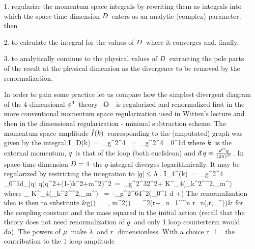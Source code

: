 1. regularize the momentum space integrals by
rewriting them as integrals into which the space-time
dimension \s$D\hspace{0.05cm}$ enters as an analytic (complex) parameter,
then
\vskip 0.2cm

2. to calculate the integral for the values of \s$D\hspace{0.05cm}$
where it converges and, finally,
\vskip 0.2cm

3. to analytically continue
to the physical values of \s$D\hspace{0.05cm}$ extracting the pole parts
of the result at the physical dimension as the divergence
to be removed by the renormalization.
\vskip 0.6cm


In order to gain some practice let us compare how the
simplest divergent diagram of the 4-dimensional \s$\phi^3\hspace{0.05cm}$
theory \s${\Large{-\hs{-0.1cm}{\rm O}\hs{-0.1cm}-}}\s$ is regularized
and renormalized first in the more conventional momentum
space regularization used in Witten's lecture and then
in the dimensional regularization - minimal subtraction scheme.
The momentum space amplitude \s$\hat I(k)\hspace{0.05cm}$
corresponding to the (amputated) graph
was given by the integral
\qq
\hat I_D(k)\ =\ {_{g^2}\over^4}
\ =\
{_{g^2}\over^4}
\int_0^1d\alpha{}
\label{ampel}
\qqq
where \s$k\hspace{0.05cm}$ is the external momentum, \s$q\hspace{0.05cm}$ is that
of the loop (both euclidean) and \s$\dd q \equiv{d^Dq\over{(2\pi)^D}}\s$.
In space-time dimension \s$D=4\hspace{0.05cm}$ the \s$q$-integral
diverges logarithmically. It may be regularized by restricting
the integration to \s$|q|\leq\Lambda\hspace{0.05cm}$.
\qq
\hat I_4^\La(k)\ =\ {_{g^2}\over^4}
\int_0^1d\alpha\int\limits_{|q|\leq\La}
{\dd q\over (q^2+\alpha(1-\alpha)k^2+m^2)^2}\ =\
{_{g^2}\over^{32\pi^2}}\s\m\ln{{_\La\over^\mu}}\s+\s
\hat K^\La_4({_{k^2}\over^{\mu^2}},{_m\over^\mu})
\non
\qqq
where
\qq
\lim\limits_{\La\to\infty}
\hat K^\La_4({_{k^2}\over^{\mu^2}},{_m\over^\mu})
\ =\ -{_{g^2}\over^{64\pi^2}}\left(\int_0^1 d\alpha
\s\s\ln{[\alpha(1-\alpha)\m{_{k^2}
\over^{\mu^2}}\m+\m{_{m^2}\over^{\mu^2}}]}
\s+\s1\right)
\label{finite}
\qqq
The renormalization idea is then to substitute
\qq
&g(\La)\ =\ \mu\la\s,\quad\quad
m^2(\La)\ =\ \mu^2\left(r\s+\s\sum\limits_{n=1}^\infty{\hh}^n\s
\delta r_n(\la,r,{_\La\over^\mu})\right)&
\label{momsc}
\qqq
for the coupling constant and the mass squared in the initial
action (recall that the theory does not need renormalization
of \s$g\hspace{0.05cm}$ and only 1 loop counterterm would do).
The powers of \s$\mu\hspace{0.05cm}$ make \s$\lambda\hspace{0.05cm}$
and \s$r\hspace{0.05cm}$ dimensionless. With a choice
\qq
\delta r_1\s=\s
\ln{{_\La\over^\mu}}
\non
\qqq
the contribution to the 1 loop amplitude
